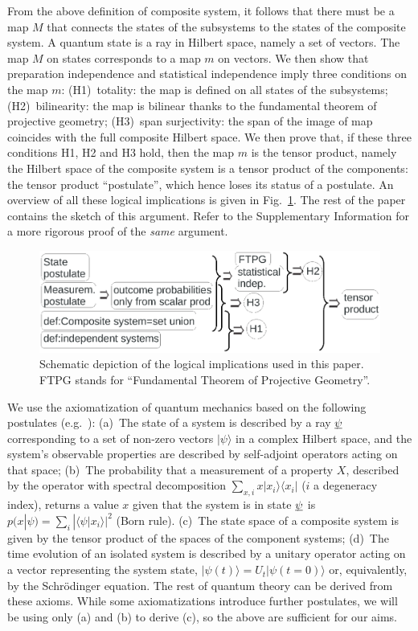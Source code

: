 \documentclass[aps,prl,amsmath,amssymb,twocolumn,nofootinbib]{revtex4}
\theoremstyle{plain}
\theoremstyle{definition}
\theoremstyle{remark}
\newcommand{\pj}[1] {\underbar{$#1$}}
\def\>{\rangle}
\def\<{\langle}
\begin{document}
From the above definition of composite system, it follows that there
must be a map $M$ that connects the states of the subsystems to the
states of the composite system. A quantum state is a ray in Hilbert
space, namely a set of vectors. The map $M$ on states corresponds to a
map $m$ on vectors. We then show that preparation independence and
statistical independence imply three conditions on the map $m$:
(H1)~totality: the map is defined on all states of the subsystems;
(H2)~bilinearity: the map is bilinear thanks to the fundamental
theorem of projective geometry; (H3)~span surjectivity: the span of
the image of map coincides with the full composite Hilbert space.  We
then prove that, if these three conditions H1, H2 and H3 hold, then
the map $m$ is the tensor product, namely the Hilbert space of the
composite system is a tensor product of the components: the tensor
product ``postulate'', which hence loses its status of a postulate. An
overview of all these logical implications is given in
Fig.~\ref{f:fig}. The rest of the paper contains the sketch of this
argument. Refer to the Supplementary Information for a more rigorous
proof of the \emph{same} argument.

\begin{figure}[ht]
\includegraphics[width=\linewidth, trim={0.2in 5.8in 2.5in 0.1in}, clip=true]{fig.eps}
\caption{Schematic depiction of the logical implications used
in this paper. FTPG stands for ``Fundamental Theorem of Projective Geometry''.  \label{f:fig}}\end{figure}

We use the axiomatization of quantum mechanics based on the following
postulates (e.g.~\cite{ozawa,masanes,wootters,nielsenchuang}): (a)~The state of a
system is described by a ray $\pj{\psi}$ corresponding to a set of
non-zero vectors $|\psi\>$ in a complex Hilbert space, and the
system's observable properties are described by self-adjoint operators
acting on that space; (b)~The probability that a measurement of a
property $X$, described by the operator with spectral decomposition
$\sum_{x,i}x|x_i\>\<x_i|$ ($i$ a degeneracy index), returns a value
$x$ given that the system is in state $\pj{\psi}$ is
$p(x|\psi)=\sum_i|\<\psi|x_i\>|^2$ (Born rule). (c)~The state
space of a composite system is given by the tensor product of the
spaces of the component systems; (d)~The time evolution of an isolated
system is described by a unitary operator acting on a vector
representing the system state, $|\psi({t})\>=U_{t}|\psi({t}=0)\>$ or,
equivalently, by the Schr\"odinger equation. The rest of quantum
theory can be derived from these axioms. While some axiomatizations
introduce further postulates, we will be using only (a) and (b) to
derive (c), so the above are sufficient for our aims.
\end{document}
